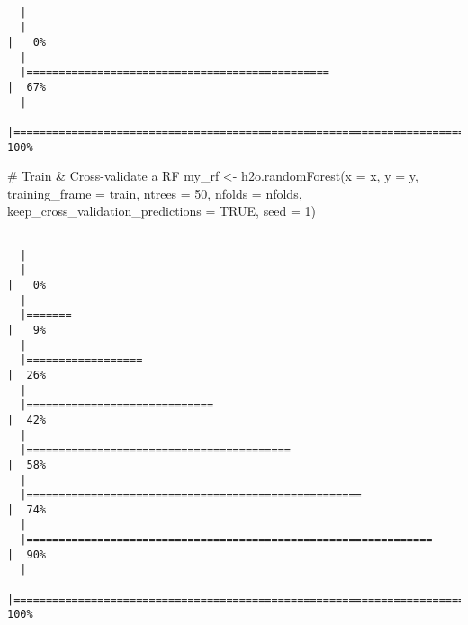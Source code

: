\documentclass[
  letterpaper,
  DIV=11,
  numbers=noendperiod]{scrartcl}
\newenvironment{Shaded}{\begin{snugshade}}{\end{snugshade}}
\newcommand{\AttributeTok}[1]{\textcolor[rgb]{0.40,0.45,0.13}{#1}}
\newcommand{\CommentTok}[1]{\textcolor[rgb]{0.37,0.37,0.37}{#1}}
\newcommand{\ConstantTok}[1]{\textcolor[rgb]{0.56,0.35,0.01}{#1}}
\newcommand{\DecValTok}[1]{\textcolor[rgb]{0.68,0.00,0.00}{#1}}
\newcommand{\FunctionTok}[1]{\textcolor[rgb]{0.28,0.35,0.67}{#1}}
\newcommand{\NormalTok}[1]{\textcolor[rgb]{0.00,0.23,0.31}{#1}}
\newcommand{\OtherTok}[1]{\textcolor[rgb]{0.00,0.23,0.31}{#1}}
\begin{document}
\begin{verbatim}

  |                                                                            
  |                                                                      |   0%
  |                                                                            
  |===============================================                       |  67%
  |                                                                            
  |======================================================================| 100%
\end{verbatim}

\begin{Shaded}
\begin{Highlighting}[]
\CommentTok{\# Train \& Cross{-}validate a RF}
\NormalTok{my\_rf }\OtherTok{\textless{}{-}} \FunctionTok{h2o.randomForest}\NormalTok{(}\AttributeTok{x =}\NormalTok{ x,}
                          \AttributeTok{y =}\NormalTok{ y,}
                          \AttributeTok{training\_frame =}\NormalTok{ train,}
                          \AttributeTok{ntrees =} \DecValTok{50}\NormalTok{,}
                          \AttributeTok{nfolds =}\NormalTok{ nfolds,}
                          \AttributeTok{keep\_cross\_validation\_predictions =} \ConstantTok{TRUE}\NormalTok{,}
                          \AttributeTok{seed =} \DecValTok{1}\NormalTok{)}
\end{Highlighting}
\end{Shaded}

\begin{verbatim}

  |                                                                            
  |                                                                      |   0%
  |                                                                            
  |=======                                                               |   9%
  |                                                                            
  |==================                                                    |  26%
  |                                                                            
  |=============================                                         |  42%
  |                                                                            
  |=========================================                             |  58%
  |                                                                            
  |====================================================                  |  74%
  |                                                                            
  |===============================================================       |  90%
  |                                                                            
  |======================================================================| 100%
\end{verbatim}
\end{document}
